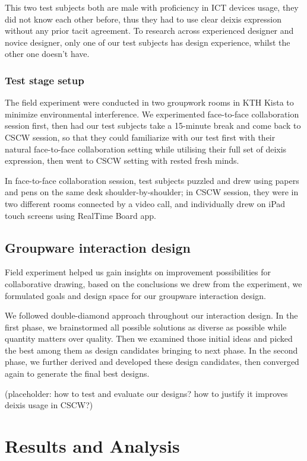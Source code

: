 \documentclass[12pt,twoside]{article}
\begin{document}
This two test subjects both are male with proficiency in ICT devices usage, they did not know each other before, thus they had to use clear deixis expression without any prior tacit agreement. To research across experienced designer and novice designer, only one of our test subjects has design experience, whilst the other one doesn't have. 

\subsubsection{Test stage setup}

The field experiment were conducted in two groupwork rooms in KTH Kista to minimize environmental interference. We experimented face-to-face collaboration session first, then had our test subjects take a 15-minute break and come back to CSCW session, so that they could familiarize with our test first with their natural face-to-face collaboration setting while utilising their full set of deixis expression, then went to CSCW setting with rested fresh minds.

In face-to-face collaboration session, test subjects puzzled and drew using papers and pens on the same desk shoulder-by-shoulder; in CSCW session, they were in two different rooms connected by a video call, and individually drew on iPad touch screens using RealTime Board app.

\subsection{Groupware interaction design}
\label{sect:groupware}
Field experiment helped us gain insights on improvement possibilities for collaborative drawing, based on the conclusions we drew from the experiment, we formulated goals and design space for our groupware interaction design.

We followed double-diamond approach throughout our interaction design. In the first phase, we brainstormed all possible solutions as diverse as possible while quantity matters over quality. Then we examined those initial ideas and picked the best among them as design candidates bringing to next phase. In the second phase, we further derived and developed these design candidates, then converged again to generate the final best designs.

(placeholder: how to test and evaluate our designs? how to justify it improves deixis usage in CSCW?)

\section{Results and Analysis}
\label{sec:results}
\end{document}
